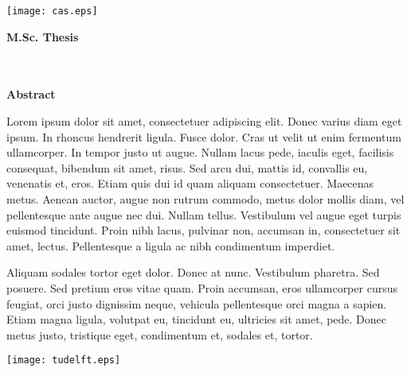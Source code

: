 %
\vspace*{-2cm}%
%
\noindent%
\texttt{[image: cas.eps]}%
%
%
%
\hfill 
\setlength{\fboxsep}{5mm}%
\raisebox{14mm}{\framebox{\textbf{\NR}}}

\vspace{10mm}

\begin{center}%
\Huge{\textbf{M.Sc. Thesis}} \\%
\raisebox{3mm}{\rule{\linewidth}{3pt}} \\%
\huge{\textbf{\TITLE}} \\%
\vspace{10mm}
\large{\textbf{\AUTHOR}}%

\vspace{10mm}

\begin{minipage}{0.8\textwidth}
\setlength{\parindent}{2em}
\begin{center}\textbf{Abstract}\end{center}
Lorem ipsum dolor sit amet, consectetuer adipiscing elit. Donec varius diam eget ipsum. In rhoncus hendrerit ligula. Fusce dolor. Cras ut velit ut enim fermentum ullamcorper. In tempor justo ut augue. Nullam lacus pede, iaculis eget, facilisis consequat, bibendum sit amet, risus. Sed arcu dui, mattis id, convallis eu, venenatis et, eros. Etiam quis dui id quam aliquam consectetuer. Maecenas metus. Aenean auctor, augue non rutrum commodo, metus dolor mollis diam, vel pellentesque ante augue nec dui. Nullam tellus. Vestibulum vel augue eget turpis euismod tincidunt. Proin nibh lacus, pulvinar non, accumsan in, consectetuer sit amet, lectus. Pellentesque a ligula ac nibh condimentum imperdiet.

Aliquam sodales tortor eget dolor. Donec at nunc. Vestibulum pharetra. Sed posuere. Sed pretium eros vitae quam. Proin accumsan, eros ullamcorper cursus feugiat, orci justo dignissim neque, vehicula pellentesque orci magna a sapien. Etiam magna ligula, volutpat eu, tincidunt eu, ultricies sit amet, pede. Donec metus justo, tristique eget, condimentum et, sodales et, tortor. 
\end{minipage}
\end{center}
%
\vfill%
%
\noindent%
\texttt{[image: tudelft.eps]}%
\hfill%
\small{\FAC}%
%
